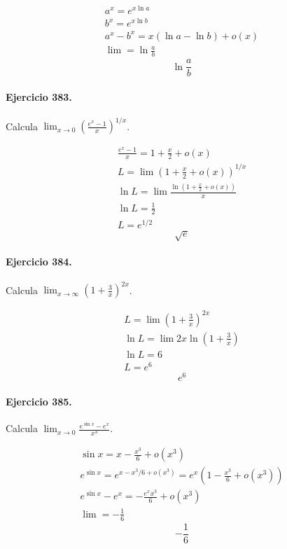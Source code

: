 \documentclass[11pt,a4paper]{article}
\begin{document}
\[
\begin{aligned}
a^x=e^{x\ln a}\\
b^x=e^{x\ln b}\\
a^x-b^x=x(\ln a-\ln b)+o(x)\\
\lim=\ln\frac{a}{b}
\end{aligned}
\]
\[\boxed{\ln\frac{a}{b}}\]


\paragraph{Ejercicio 383.} Calcula $\displaystyle \lim_{x\to0}\left(\frac{e^x-1}{x}\right)^{1/x}$.

\[
\begin{aligned}
\frac{e^x-1}{x}=1+\frac{x}{2}+o(x)\\
L=\lim\left(1+\frac{x}{2}+o(x)\right)^{1/x}\\
\ln L=\lim\frac{\ln(1+\frac{x}{2}+o(x))}{x}\\
\ln L=\frac12\\
L=e^{1/2}
\end{aligned}
\]
\[\boxed{\sqrt e}\]


\paragraph{Ejercicio 384.} Calcula $\displaystyle \lim_{x\to\infty}\left(1+\frac{3}{x}\right)^{2x}$.

\[
\begin{aligned}
L=\lim\left(1+\frac{3}{x}\right)^{2x}\\
\ln L=\lim 2x\ln\left(1+\frac{3}{x}\right)\\
\ln L=6\\
L=e^6
\end{aligned}
\]
\[\boxed{e^6}\]


\paragraph{Ejercicio 385.} Calcula $\displaystyle \lim_{x\to0}\frac{e^{\sin x}-e^x}{x^3}$.

\[
\begin{aligned}
\sin x=x-\frac{x^3}{6}+o(x^3)\\
e^{\sin x}=e^{x-x^3/6+o(x^3)}=e^x\left(1-\frac{x^3}{6}+o(x^3)\right)\\
e^{\sin x}-e^x=-\frac{e^xx^3}{6}+o(x^3)\\
\lim=-\frac16
\end{aligned}
\]
\[\boxed{-\frac16}\]
\end{document}

